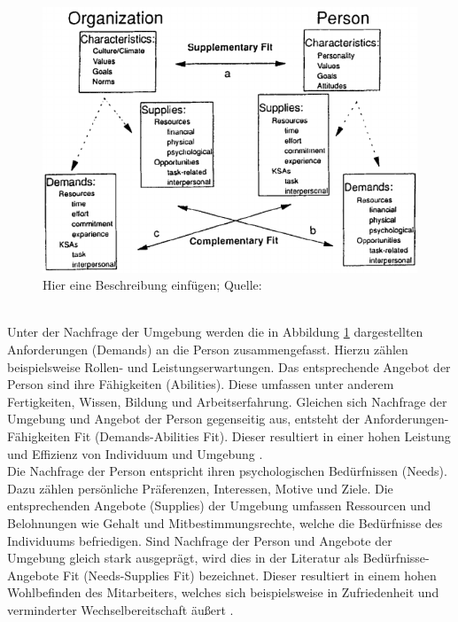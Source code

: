\begin{figure}[h]
	\centering
	\includegraphics[width=1\textwidth]{gfx/supplementaryComplementaryFit.png}
	\caption{Hier eine Beschreibung einfügen; Quelle: \cite[S. 4]{kristof:1996}}
	\label{fig:personEnvironmentFit:supplementaryUndComplementary:abb1}
\end{figure}
\\
Unter der Nachfrage der Umgebung werden die in Abbildung \ref{fig:personEnvironmentFit:supplementaryUndComplementary:abb1} dargestellten Anforderungen (Demands) an die Person zusammengefasst. Hierzu zählen beispielsweise Rollen- und Leistungserwartungen. Das entsprechende Angebot der Person sind ihre Fähigkeiten (Abilities). Diese umfassen unter anderem Fertigkeiten, Wissen, Bildung und Arbeitserfahrung. Gleichen sich Nachfrage der Umgebung und Angebot der Person gegenseitig aus, entsteht der Anforderungen-Fähigkeiten Fit (Demands-Abilities Fit). Dieser resultiert in einer hohen Leistung und Effizienz von Individuum und Umgebung \cite[S. 3f.]{edwards:1991}\cite[S. 5]{edwards:1996}\cite[S. 4f.]{edwards:2007}\cite[S. 6]{su:2015}.\\
Die Nachfrage der Person entspricht ihren psychologischen Bedürfnissen (Needs). Dazu zählen persönliche Präferenzen, Interessen, Motive und Ziele. Die entsprechenden Angebote (Supplies) der Umgebung umfassen Ressourcen und Belohnungen wie Gehalt und Mitbestimmungsrechte, welche die Bedürfnisse des Individuums befriedigen. Sind Nachfrage der Person und Angebote der Umgebung gleich stark ausgeprägt, wird dies in der Literatur als Bedürfnisse-Angebote Fit (Needs-Supplies Fit) bezeichnet. Dieser resultiert in einem hohen Wohlbefinden des Mitarbeiters, welches sich beispielsweise in Zufriedenheit und verminderter Wechselbereitschaft äußert \cite[S. 2]{edwards:2004}\cite[S. 2f.]{edwards:1996}\cite[S. 4]{edwards:2008}\cite[S. 4f.]{edwards:2007}\cite[S. 6]{su:2015}.\\
